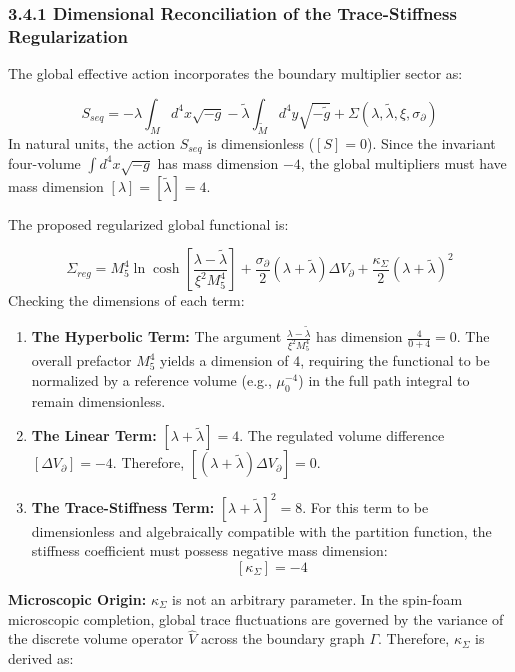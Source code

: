 \documentclass[aps,prd,onecolumn,superscriptaddress,nofootinbib,longbibliography,10pt]{revtex4-2}
\begin{document}
  
\subsubsection*{3.4.1 Dimensional Reconciliation of the Trace-Stiffness Regularization}

  The global effective action incorporates the boundary multiplier sector as:


  \[ S_{seq} = -\lambda \int_M d^4x \sqrt{-g} - \tilde{\lambda} \int_{\tilde{M}} d^4y \sqrt{-\tilde{g}} + \Sigma(\lambda, \tilde{\lambda}, \xi, \sigma_\partial) \]
  In natural units, the action \(S_{seq}\) is dimensionless (\([S] = 0\)). Since the invariant four-volume \(\int d^4x \sqrt{-g}\) has mass dimension \(-4\), the global multipliers must have mass dimension \([\lambda] = [\tilde{\lambda}] = 4\).


  The proposed regularized global functional is:


  \[ \Sigma_{reg} = M_5^4 \ln\cosh\left[\frac{\lambda - \tilde{\lambda}}{\xi^2 M_5^4}\right] + \frac{\sigma_\partial}{2}(\lambda + \tilde{\lambda})\Delta V_\partial + \frac{\kappa_\Sigma}{2}(\lambda + \tilde{\lambda})^2 \]
  Checking the dimensions of each term:


  
\begin{enumerate}
    
\item \textbf{The Hyperbolic Term:} The argument \(\frac{\lambda - \tilde{\lambda}}{\xi^2 M_5^4}\) has dimension \(\frac{4}{0+4} = 0\). The overall prefactor \(M_5^4\) yields a dimension of \(4\), requiring the functional to be normalized by a reference volume (e.g., \(\mu_0^{-4}\)) in the full path integral to remain dimensionless.
    
\item \textbf{The Linear Term:} \([\lambda + \tilde{\lambda}] = 4\). The regulated volume difference \([\Delta V_\partial] = -4\). Therefore, \([(\lambda + \tilde{\lambda})\Delta V_\partial] = 0\).
    
\item \textbf{The Trace-Stiffness Term:} \([\lambda + \tilde{\lambda}]^2 = 8\). For this term to be dimensionless and algebraically compatible with the partition function, the stiffness coefficient must possess negative mass dimension:
    \[ [\kappa_\Sigma] = -4 \]
  
\end{enumerate}

  \textbf{Microscopic Origin:} \(\kappa_\Sigma\) is not an arbitrary parameter. In the spin-foam microscopic completion, global trace fluctuations are governed by the variance of the discrete volume operator \(\hat{V}\) across the boundary graph \(\Gamma\). Therefore, \(\kappa_\Sigma\) is derived as:
\end{document}
